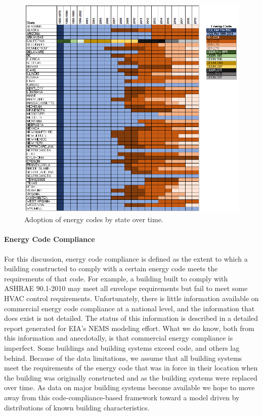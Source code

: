 \begin{figure}
  \centering
  \includegraphics[]{figures/energy_code.png}
  \caption{Adoption of energy codes by state over time.}
  \label{fig:energy_code}
\end{figure}

\paragraph{Energy Code Compliance}
For this discussion, energy code compliance is defined as the extent to which a building constructed to comply with a certain energy code meets the requirements of that code. For example, a building built to comply with ASHRAE 90.1-2010 may meet all envelope requirements but fail to meet some HVAC control requirements. Unfortunately, there is little information available on commercial energy code compliance at a national level, and the information that does exist is not detailed. The status of this information is described in a detailed report \citep{icf_com_code_compliance_status} generated for EIA’s NEMS modeling effort. What we do know, both from this information and anecdotally, is that commercial energy compliance is imperfect. Some buildings and building systems exceed code, and others lag behind. Because of the data limitations, we assume that all building systems meet the requirements of the energy code that was in force in their location when the building was originally constructed and as the building systems were replaced over time. As data on major building systems become available we hope to move away from this code-compliance-based framework toward a model driven by distributions of known building characteristics.

